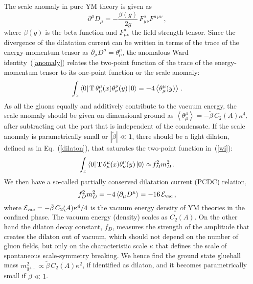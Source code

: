 \documentclass[prl,aps,
showpacs,
preprint,
nofootinbib,
floatfix,
superscriptaddress, showkeys
]{revtex4-1}
\begin{document}
The scale anomaly in pure YM theory is given as 
\begin{equation}
\partial^{\mu}D_{\mu}=-\frac{\beta(g)}{2g}\,F^a_{\mu\nu}F^{a\,\mu\nu}\,,
\label{anomaly}
\end{equation}
where $\beta(g)$ is the beta function  and $F_{\mu\nu}^a$ the field-strength tensor. Since the divergence of the dilatation current can be written in terms of the trace of the energy-momentum tensor
as $\partial_{\mu}D^{\mu}=\theta^{\mu}_{\mu}$, the anomalous Ward identity~(\ref{anomaly}) relates the two-point function of the trace of the energy-momentum tensor to its one-point function or the scale anomaly:
\begin{equation}
\int_x\left<0\right|{\rm T}\,\theta^{\mu}_{\mu}(x)\theta^{\nu}_{\nu}(y)\left|0\right>=-4\left<\theta^{\mu}_{\mu}(y)\right>\,.
\label{wi}
\end{equation}
As all the gluons equally and additively contribute to the vacuum energy, the scale anomaly should be given on dimensional ground as $\left<\theta^{\mu}_{\mu}\right>=-\tilde\beta\,C_2(A)\kappa^4$, after subtracting out the part that is independent of the condensate.  If the scale anomaly is parametrically small or $|\tilde\beta|\ll1$, there should be a light dilaton, defined as in Eq.~(\ref{dilaton}), that saturates the two-point function in~(\ref{wi}):
\begin{equation}
\int_x \left<0\right|{\rm T}\,\theta^{\mu}_{\mu}(x)\theta^{\nu}_{\nu}(y)\left|0\right>\approx \!
f_D^2m_D^2\,.
\label{pcdc}
\end{equation}
We then have a so-called partially conserved dilatation current (PCDC) relation, 
\begin{equation}
f_D^2m_D^2=-4 \left<\partial_{\mu}D^{\mu}\right>=-16\,{\cal E}_{\rm vac}\,,
\label{scale anomaly}
\end{equation}
where ${\cal E}_{\rm vac}=-\tilde\beta\,C_2(A)\kappa^4/4$ is the vacuum energy density of YM theories in the confined phase.
The vacuum energy (density) scales as $C_2(A)$.  On the other hand the dilaton decay constant, $f_D$, 
measures the strength of the amplitude that creates the dilaton out of vacuum, 
which should not depend on the number of gluon fields, but only on the characteristic scale $\kappa$ that defines the scale of spontaneous scale-symmetry breaking. 
We hence find the ground state glueball mass $m_{0^{++}}^2\propto \tilde\beta\, C_2(A)\kappa^2$, if identified as dilaton, and it becomes parametrically small if $\tilde\beta\ll1$.
\end{document}
